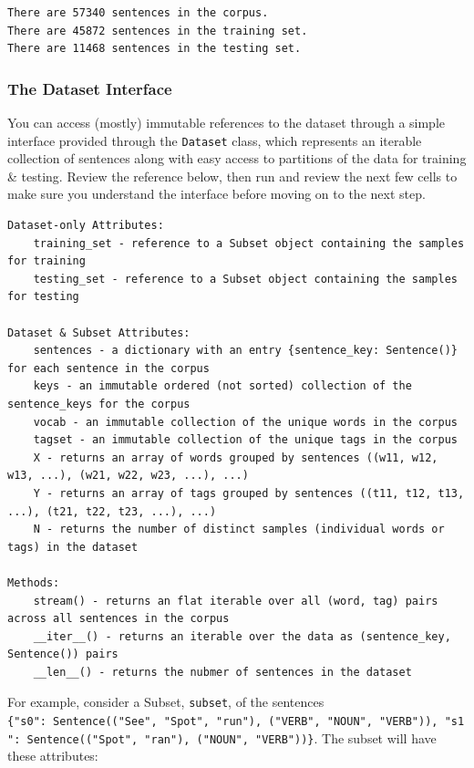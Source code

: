 \documentclass[11pt]{article}
\begin{document}
    \begin{Verbatim}[commandchars=\\\{\}]
There are 57340 sentences in the corpus.
There are 45872 sentences in the training set.
There are 11468 sentences in the testing set.

    \end{Verbatim}

    \hypertarget{the-dataset-interface}{%
\subsubsection{The Dataset Interface}\label{the-dataset-interface}}

You can access (mostly) immutable references to the dataset through a
simple interface provided through the \texttt{Dataset} class, which
represents an iterable collection of sentences along with easy access to
partitions of the data for training \& testing. Review the reference
below, then run and review the next few cells to make sure you
understand the interface before moving on to the next step.

\begin{verbatim}
Dataset-only Attributes:
    training_set - reference to a Subset object containing the samples for training
    testing_set - reference to a Subset object containing the samples for testing

Dataset & Subset Attributes:
    sentences - a dictionary with an entry {sentence_key: Sentence()} for each sentence in the corpus
    keys - an immutable ordered (not sorted) collection of the sentence_keys for the corpus
    vocab - an immutable collection of the unique words in the corpus
    tagset - an immutable collection of the unique tags in the corpus
    X - returns an array of words grouped by sentences ((w11, w12, w13, ...), (w21, w22, w23, ...), ...)
    Y - returns an array of tags grouped by sentences ((t11, t12, t13, ...), (t21, t22, t23, ...), ...)
    N - returns the number of distinct samples (individual words or tags) in the dataset

Methods:
    stream() - returns an flat iterable over all (word, tag) pairs across all sentences in the corpus
    __iter__() - returns an iterable over the data as (sentence_key, Sentence()) pairs
    __len__() - returns the nubmer of sentences in the dataset
\end{verbatim}

For example, consider a Subset, \texttt{subset}, of the sentences
\texttt{\{"s0":\ Sentence(("See",\ "Spot",\ "run"),\ ("VERB",\ "NOUN",\ "VERB")),\ "s1":\ Sentence(("Spot",\ "ran"),\ ("NOUN",\ "VERB"))\}}.
The subset will have these attributes:
\end{document}
